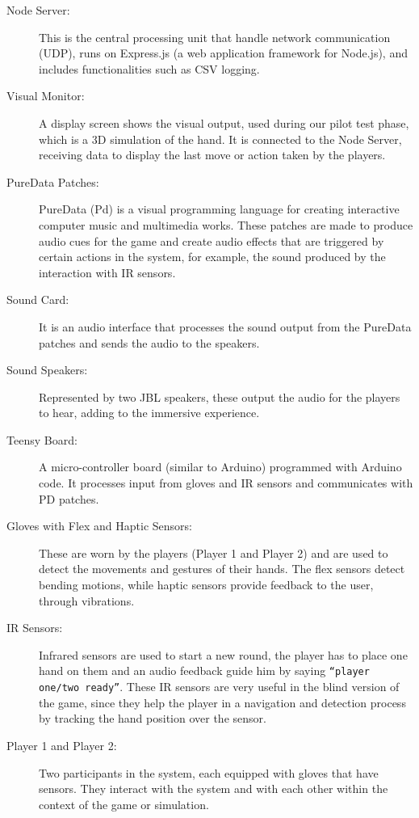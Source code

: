 \documentclass[11pt,a4paper]{report}
\begin{document}
\begin{description}
  \item [Node Server:] This is the central processing unit that handle network communication (UDP), runs on Express.js (a web application framework for Node.js), and includes functionalities such as CSV logging. 
  \item [Visual Monitor:] A display screen shows the visual output, used during our pilot test phase, which is a 3D simulation of the hand. It is connected to the Node Server, receiving data to display the last move or action taken by the players.
  \item [PureData Patches:] PureData (Pd) is a visual programming language for creating interactive computer music and multimedia works. These patches are made to produce audio cues for the game and create audio effects that are triggered by certain actions in the system, for example, the sound produced by the interaction with IR sensors.
  \item [Sound Card:] It is an audio interface that processes the sound output from the PureData patches and sends the audio to the speakers.
  \item [Sound Speakers:] Represented by two JBL speakers, these output the audio for the players to hear, adding to the immersive experience.
  \item [Teensy Board:] A micro-controller board (similar to Arduino) programmed with Arduino code. It processes input from gloves and IR sensors and communicates with PD patches.
  \item [Gloves with Flex and Haptic Sensors:] These are worn by the players (Player 1 and Player 2) and are used to detect the movements and gestures of their hands. The flex sensors detect bending motions, while haptic sensors provide feedback to the user, through vibrations.
  \item [IR Sensors:] Infrared sensors are used to start a new round, the player has to place one hand on them and an audio feedback guide him by saying \texttt{“player one/two ready”}. These IR sensors are very useful in the blind version of the game, since they help the player in a navigation and detection process by tracking the hand position over the sensor.
  \item [Player 1 and Player 2:] Two participants in the system, each equipped with gloves that have sensors. They interact with the system and with each other within the context of the game or simulation.
\end{description}
\end{document}
